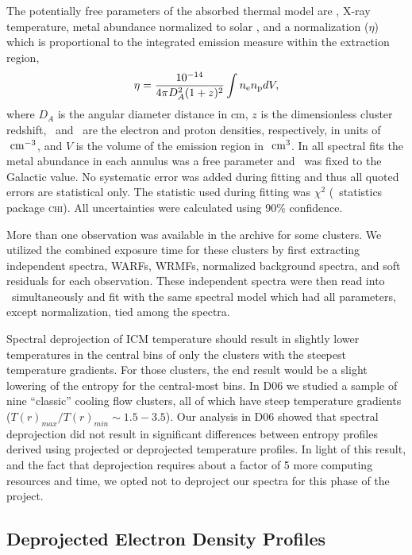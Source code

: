 \documentclass[12pt,preprint]{aastex}
\begin{document}
The potentially free parameters of the absorbed thermal model are
\nhi, X-ray temperature, metal abundance normalized to solar
\citep[heavy-element ratios taken from][]{ag89}, and a normalization
($\eta$) which is proportional to the integrated emission measure
within the extraction region,
\begin{equation}
\label{eqn:norm}
\eta = \frac{10^{-14}}{4\pi D_A^2(1+z)^2}\int n_{\mathrm{e}} n_{\mathrm{p}} dV,
\end{equation}
where $D_A$ is the angular diameter distance in cm, $z$ is the
dimensionless cluster redshift, \nelec\ and \np\ are the electron and
proton densities, respectively, in units of $\mbox{\ensuremath{\mathrm{~cm}}}^{-3}$, and $V$ is the
volume of the emission region in $\mbox{\ensuremath{\mathrm{~cm}}}^3$. In all spectral fits the
metal abundance in each annulus was a free parameter and \nhi\ was
fixed to the Galactic value. No systematic error was added during
fitting and thus all quoted errors are statistical only. The statistic
used during fitting was $\chi^2$ (\xspec\ statistics package
\textsc{chi}). All uncertainties were calculated using 90\%
confidence.

More than one observation was available in the archive for some
clusters. We utilized the combined exposure time for these clusters by
first extracting independent spectra, WARFs, WRMFs, normalized
background spectra, and soft residuals for each observation. These
independent spectra were then read into \xspec\ simultaneously and fit
with the same spectral model which had all parameters, except
normalization, tied among the spectra.

Spectral deprojection of ICM temperature should result in slightly
lower temperatures in the central bins of only the clusters with the
steepest temperature gradients. For those clusters, the end result
would be a slight lowering of the entropy for the central-most
bins. In D06 we studied a sample of nine ``classic'' cooling flow
clusters, all of which have steep temperature gradients
($T(r)_{max}/T(r)_{min} \sim 1.5-3.5$). Our analysis in D06 showed
that spectral deprojection did not result in significant differences
between entropy profiles derived using projected or deprojected
temperature profiles. In light of this result, and the fact that
deprojection requires about a factor of 5 more computing resources and
time, we opted not to deproject our spectra for this phase of the
project.

\subsection{Deprojected Electron Density Profiles}
\label{sec:dene}
\end{document}
